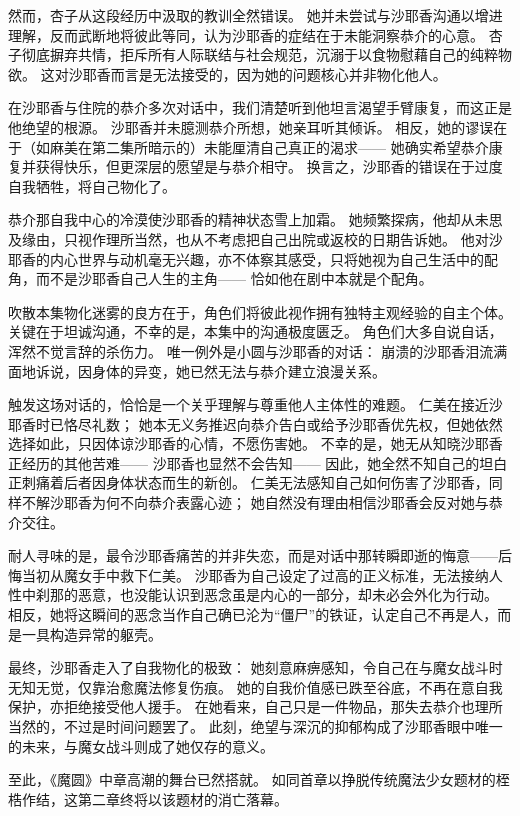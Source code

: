 然而，杏子从这段经历中汲取的教训全然错误。
她并未尝试与沙耶香沟通以增进理解，反而武断地将彼此等同，认为沙耶香的症结在于未能洞察恭介的心意。
杏子彻底摒弃共情，拒斥所有人际联结与社会规范，沉溺于以食物慰藉自己的纯粹物欲。
这对沙耶香而言是无法接受的，因为她的问题核心并非物化他人。

在沙耶香与住院的恭介多次对话中，我们清楚听到他坦言渴望手臂康复，而这正是他绝望的根源。
沙耶香并未臆测恭介所想，她亲耳听其倾诉。
相反，她的谬误在于（如麻美在第二集所暗示的）未能厘清自己真正的渴求——
她确实希望恭介康复并获得快乐，但更深层的愿望是与恭介相守。
换言之，沙耶香的错误在于过度自我牺牲，将自己物化了。

恭介那自我中心的冷漠使沙耶香的精神状态雪上加霜。
她频繁探病，他却从未思及缘由，只视作理所当然，也从不考虑把自己出院或返校的日期告诉她。
他对沙耶香的内心世界与动机毫无兴趣，亦不体察其感受，只将她视为自己生活中的配角，而不是沙耶香自己人生的主角——
恰如他在剧中本就是个配角。

吹散本集物化迷雾的良方在于，角色们将彼此视作拥有独特主观经验的自主个体。
关键在于坦诚沟通，不幸的是，本集中的沟通极度匮乏。
角色们大多自说自话，浑然不觉言辞的杀伤力。
唯一例外是小圆与沙耶香的对话：
崩溃的沙耶香泪流满面地诉说，因身体的异变，她已然无法与恭介建立浪漫关系。

触发这场对话的，恰恰是一个关乎理解与尊重他人主体性的难题。
仁美在接近沙耶香时已恪尽礼数；
她本无义务推迟向恭介告白或给予沙耶香优先权，但她依然选择如此，只因体谅沙耶香的心情，不愿伤害她。
不幸的是，她无从知晓沙耶香正经历的其他苦难——
沙耶香也显然不会告知——
因此，她全然不知自己的坦白正刺痛着后者因身体状态而生的新创。
仁美无法感知自己如何伤害了沙耶香，同样不解沙耶香为何不向恭介表露心迹；
她自然没有理由相信沙耶香会反对她与恭介交往。

耐人寻味的是，最令沙耶香痛苦的并非失恋，而是对话中那转瞬即逝的悔意——后悔当初从魔女手中救下仁美。
沙耶香为自己设定了过高的正义标准，无法接纳人性中刹那的恶意，也没能认识到恶念虽是内心的一部分，却未必会外化为行动。
相反，她将这瞬间的恶念当作自己确已沦为“僵尸”的铁证，认定自己不再是人，而是一具构造异常的躯壳。

最终，沙耶香走入了自我物化的极致：
她刻意麻痹感知，令自己在与魔女战斗时无知无觉，仅靠治愈魔法修复伤痕。
她的自我价值感已跌至谷底，不再在意自我保护，亦拒绝接受他人援手。
在她看来，自己只是一件物品，那失去恭介也理所当然的，不过是时间问题罢了。
此刻，绝望与深沉的抑郁构成了沙耶香眼中唯一的未来，与魔女战斗则成了她仅存的意义。

至此，《魔圆》中章高潮的舞台已然搭就。
如同首章以挣脱传统魔法少女题材的桎梏作结，这第二章终将以该题材的消亡落幕。
